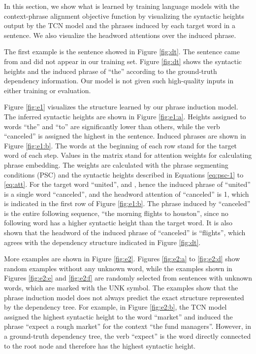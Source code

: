 \documentclass[11pt,a4paper]{article}
\begin{document}
In this section, we show what is learned by training language models with the context-phrase alignment objective function by visualizing the syntactic heights output by the TCN model and the phrases induced by each target word in a sentence. We also visualize the headword attentions over the induced phrase.

The first example is the sentence showed in Figure \ref{fig:dt}. The sentence came from \citet{jurafsky2014speech} and did not appear in our training set.  Figure \ref{fig:dt} shows the syntactic heights and the induced phrase of ``the'' according to the ground-truth dependency information. Our model is not given such high-quality inputs in either training or evaluation.



Figure \ref{fig:e1} visualizes the structure learned by our phrase induction model. The inferred syntactic heights are shown in Figure \ref{fig:e1:a}. Heights assigned to words ``the'' and ``to'' are significantly lower than others, while the verb ``canceled'' is assigned the highest in the sentence. Induced phrases are shown in Figure \ref{fig:e1:b}. The words at the beginning of each row stand for the target word of each step. Values in the matrix stand for attention weights for calculating phrase embedding. The weights are calculated with the phrase segmenting conditions (PSC) and the syntactic heights described in Equations \ref{eq:psc-1} to \ref{eq:att}. For the target word ``united'',  and , hence the induced phrase of ``united'' is a single word ``canceled'', and the headword attention of ``canceled'' is 1, which is indicated in the first row of Figure \ref{fig:e1:b}. The phrase induced by ``canceled'' is the entire following sequence, ``the morning flights to houston'', since no following word has a higher syntactic height than the target word. It is also shown that the headword of the induced phrase of ``canceled'' is ``flights'', which agrees with the dependency structure indicated in Figure \ref{fig:dt}.

More examples are shown in Figure \ref{fig:e2}. Figures \ref{fig:e2:a} to \ref{fig:e2:d} show random examples without any unknown word, while the examples shown in Figures \ref{fig:e2:e} and \ref{fig:e2:f} are randomly selected from sentences with unknown words, which are marked with the UNK symbol. The examples show that the phrase induction model does not always predict the exact structure represented by the dependency tree. For example, in Figure \ref{fig:e2:b}, the TCN model assigned the highest syntactic height to the word ``market'' and induced the phrase ``expect a rough market'' for the context ``the fund managers''. However, in a ground-truth dependency tree, the verb ``expect'' is the word directly connected to the root node and therefore has the highest syntactic height.
\end{document}
